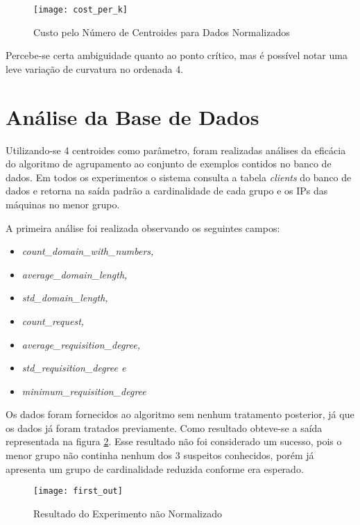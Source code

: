 \begin{figure}[htbp]
\centering
\texttt{[image: cost\_per\_k]}
\caption[Custo pelo Número de Centroides para Dados Normalizados]{Custo pelo Número de Centroides para Dados Normalizados} \label{fig:cost_per_k}
\end{figure}

Percebe-se certa ambiguidade quanto ao ponto crítico, mas é possível notar uma leve variação de curvatura no ordenada 4.

\section{Análise da Base de Dados}
\label{sec:db_analysis}

Utilizando-se 4 centroides como parâmetro, foram realizadas análises da eficácia do algoritmo de agrupamento ao conjunto de exemplos contidos no banco de dados. Em todos os experimentos o sistema consulta a tabela \textit{clients} do banco de dados e retorna na saída padrão a cardinalidade de cada grupo e os IPs das máquinas no menor grupo.

A primeira análise foi realizada observando os seguintes campos:

\begin{itemize}
\item \textit{count\_domain\_with\_numbers, }
\item \textit{average\_domain\_length, }
\item \textit{std\_domain\_length, }
\item \textit{count\_request, }
\item \textit{average\_requisition\_degree, }
\item \textit{std\_requisition\_degree e }
\item \textit{minimum\_requisition\_degree }
\end{itemize}

Os dados foram fornecidos ao algoritmo sem nenhum tratamento posterior, já que os dados já foram tratados previamente. Como resultado obteve-se a saída representada na figura \ref{fig:first_out}. Esse resultado não foi considerado um sucesso, pois o menor grupo não continha nenhum dos 3 suspeitos conhecidos, porém já apresenta um grupo de cardinalidade reduzida conforme era esperado.

\begin{figure}[htbp]
\centering
\texttt{[image: first\_out]}
\caption[Resultado do Experimento não Normalizado]{Resultado do Experimento não Normalizado} \label{fig:first_out}
\end{figure}

